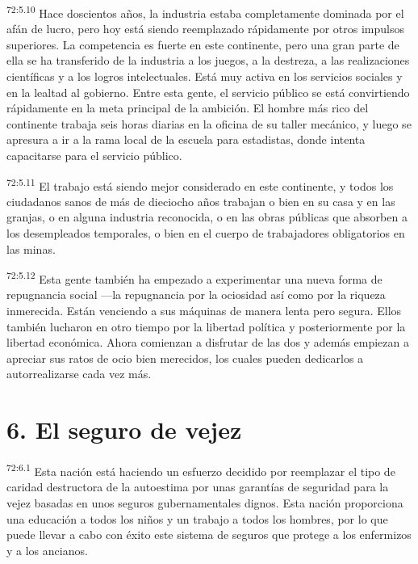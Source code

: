 \documentclass[twoside, 11pt]{book}
\begin{document}
\par
\textsuperscript{72:5.10} Hace doscientos años, la industria estaba completamente dominada por el afán de lucro, pero hoy está siendo reemplazado rápidamente por otros impulsos superiores. La competencia es fuerte en este continente, pero una gran parte de ella se ha transferido de la industria a los juegos, a la destreza, a las realizaciones científicas y a los logros intelectuales. Está muy activa en los servicios sociales y en la lealtad al gobierno. Entre esta gente, el servicio público se está convirtiendo rápidamente en la meta principal de la ambición. El hombre más rico del continente trabaja seis horas diarias en la oficina de su taller mecánico, y luego se apresura a ir a la rama local de la escuela para estadistas, donde intenta capacitarse para el servicio público.

\par
\textsuperscript{72:5.11} El trabajo está siendo mejor considerado en este continente, y todos los ciudadanos sanos de más de dieciocho años trabajan o bien en su casa y en las granjas, o en alguna industria reconocida, o en las obras públicas que absorben a los desempleados temporales, o bien en el cuerpo de trabajadores obligatorios en las minas.

\par
\textsuperscript{72:5.12} Esta gente también ha empezado a experimentar una nueva forma de repugnancia social ---la repugnancia por la ociosidad así como por la riqueza inmerecida. Están venciendo a sus máquinas de manera lenta pero segura. Ellos también lucharon en otro tiempo por la libertad política y posteriormente por la libertad económica. Ahora comienzan a disfrutar de las dos y además empiezan a apreciar sus ratos de ocio bien merecidos, los cuales pueden dedicarlos a autorrealizarse cada vez más.

\section*{6. El seguro de vejez}
\par
\textsuperscript{72:6.1} Esta nación está haciendo un esfuerzo decidido por reemplazar el tipo de caridad destructora de la autoestima por unas garantías de seguridad para la vejez basadas en unos seguros gubernamentales dignos. Esta nación proporciona una educación a todos los niños y un trabajo a todos los hombres, por lo que puede llevar a cabo con éxito este sistema de seguros que protege a los enfermizos y a los ancianos.
\end{document}
